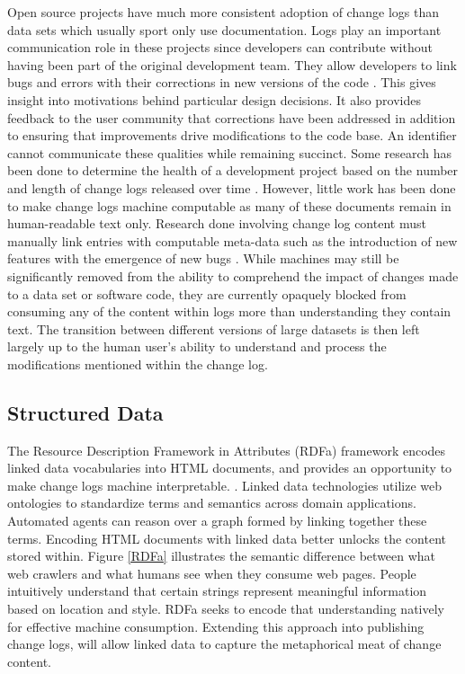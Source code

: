 Open source projects have much more consistent adoption of change logs than data sets which usually sport only use documentation.
Logs play an important communication role in these projects since developers can contribute without having been part of the original development team.
They allow developers to link bugs and errors with their corrections in new versions of the code \cite{Chen:2004:OCL:990374.990391}.
This gives insight into motivations behind particular design decisions.
It also provides feedback to the user community that corrections have been addressed in addition to ensuring that improvements drive modifications to the code base.
An identifier cannot communicate these qualities while remaining succinct.
Some research has been done to determine the health of a development project based on the number and length of change logs released over time \cite{German03automatingthe}.
However, little work has been done to make change logs machine computable as many of these documents remain in human-readable text only.
Research done involving change log content must manually link entries with computable meta-data such as the introduction of new features with the emergence of new bugs \cite{6132954}.
While machines may still be significantly removed from the ability to comprehend the impact of changes made to a data set or software code, they are currently opaquely blocked from consuming any of the content within logs more than understanding they contain text.
The transition between different versions of large datasets is then left largely up to the human user's ability to understand and process the modifications mentioned within the change log.

\subsection{Structured Data}

The Resource Description Framework in Attributes (RDFa) framework encodes linked data vocabularies into HTML documents, and provides an opportunity to make change logs machine interpretable. \cite{Adida2015}.
Linked data technologies utilize web ontologies to standardize terms and semantics across domain applications.
Automated agents can reason over a graph formed by linking together these terms.
Encoding HTML documents with linked data better unlocks the content stored within.
Figure \ref{RDFa} illustrates the semantic difference between what web crawlers and what humans see when they consume web pages.
People intuitively understand that certain strings represent meaningful information based on location and style.
RDFa seeks to encode that understanding natively for effective machine consumption.
Extending this approach into publishing change logs, will allow linked data to capture the metaphorical meat of change content.

